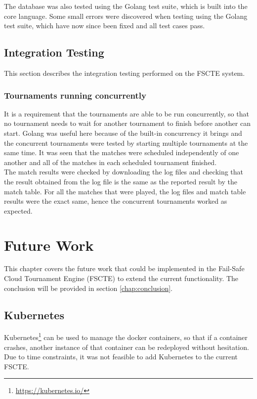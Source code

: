 \documentclass[a4paper, 11pt]{report}
\begin{document}
The database was also tested using the Golang test suite, which is built into
the core language. Some small errors were discovered when testing using the
Golang test suite, which have now since been fixed and all test cases pass.

\section{Integration Testing}
\label{sec:integ-test}

This section describes the integration testing performed on the FSCTE system.

\subsection{Tournaments running concurrently}

It is a requirement that the tournaments are able to be run concurrently, so
that no tournament needs to wait for another tournament to finish before another
can start. Golang was useful here because of the built-in concurrency it brings
and the concurrent tournaments were tested by starting multiple tournaments at
the same time. It was seen that the matches were scheduled independently of one
another and all of the matches in each scheduled tournament finished. \\

The match results were checked by downloading the log files and checking that the
result obtained from the log file is the same as the reported result by the match
table. For all the matches that were played, the log files and match table results
were the exact same, hence the concurrent tournaments worked as expected.

\chapter{Future Work}
\label{chap:future}

This chapter covers the future work that could be implemented in the Fail-Safe
Cloud Tournament Engine (FSCTE) to extend the current functionality. The
conclusion will be provided in section \ref{chap:conclusion}.

\section{Kubernetes}

Kubernetes\footnote{\url{https://kubernetes.io/}} can be used to manage the docker
containers, so that if a container crashes, another instance of that container
can be redeployed without hesitation. Due to time constraints, it was not feasible
to add Kubernetes to the current FSCTE.
\end{document}
